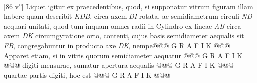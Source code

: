 [86 v\textsuperscript{o}]  Liquet igitur ex praecedentibus, quod, si supponatur vitrum  figuram illam habere quam describit \textit{KDB}, circa axem \textit{DI}  rotata, ac semidiametrum circuli \textit{ND} aequari unitati, quod  tum inquam omnes radii in Cylindro ex lineae \textit{AB} circa  axem \textit{DK} circumgyratione orto, contenti, cujus basis  semidiameter aequalis sit \textit{FB}, congregabuntur in producto  axe \textit{DK}, nempe\pend \pstart @@@ G R A F I K @@@%
                     Apparet etiam, si in vitris quorum semidiameter aequatur @@@ G R A F I K @@@%
                     digiti mensurae, sumatur apertura aequalis @@@ G R A F I K @@@%
                     quartae partis  digiti, hoc est @@@ G R A F I K @@@%
